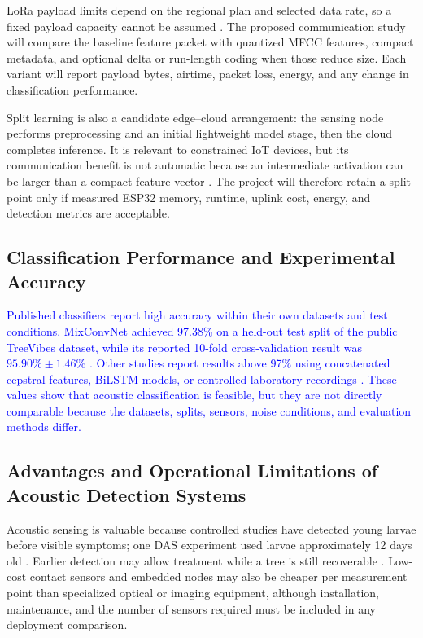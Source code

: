 \documentclass[12pt,a4paper,oneside]{memoir}
\newcommand{\earlierrevision}[1]{\textcolor{blue}{#1}}
\newcommand{\newrevision}[1]{\textcolor{green!45!black}{#1}}
\begin{document}
\newrevision{LoRa payload limits depend on the regional plan and selected data rate, so a fixed payload capacity cannot be assumed \cite{lorawan2023}. The proposed communication study will compare the baseline feature packet with quantized MFCC features, compact metadata, and optional delta or run-length coding when those reduce size. Each variant will report payload bytes, airtime, packet loss, energy, and any change in classification performance.}

\newrevision{Split learning is also a candidate edge--cloud arrangement: the sensing node performs preprocessing and an initial lightweight model stage, then the cloud completes inference. It is relevant to constrained IoT devices, but its communication benefit is not automatic because an intermediate activation can be larger than a compact feature vector \cite{duan2022}. The project will therefore retain a split point only if measured ESP32 memory, runtime, uplink cost, energy, and detection metrics are acceptable.}

\subsection{Classification Performance and Experimental Accuracy}

\earlierrevision{Published classifiers report high accuracy within their own datasets and test conditions. MixConvNet achieved 97.38\% on a held-out test split of the public TreeVibes dataset, while its reported 10-fold cross-validation result was $95.90\% \pm 1.46\%$ \cite{karar2022}. Other studies report results above 97\% using concatenated cepstral features, BiLSTM models, or controlled laboratory recordings \cite{boulila2023,saranya2025,pinhas2008}. These values show that acoustic classification is feasible, but they are not directly comparable because the datasets, splits, sensors, noise conditions, and evaluation methods differ.}

\subsection{Advantages and Operational Limitations of Acoustic Detection Systems}

Acoustic sensing is valuable because controlled studies have detected young larvae before visible symptoms; one DAS experiment used larvae approximately 12 days old \cite{ashry2020}. Earlier detection may allow treatment while a tree is still recoverable \cite{saleem2022}. Low-cost contact sensors and embedded nodes may also be cheaper per measurement point than specialized optical or imaging equipment, although installation, maintenance, and the number of sensors required must be included in any deployment comparison.
\end{document}
